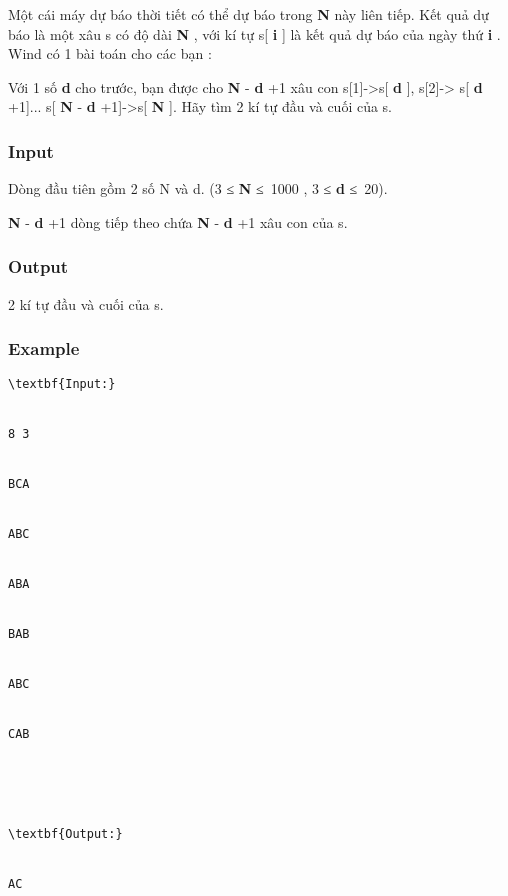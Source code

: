



   Một cái máy dự báo thời tiết có thể dự báo trong   \textbf{    N   }   này liên tiếp. Kết quả dự báo là một xâu s có độ dài   \textbf{    N   }   , với kí tự s[   \textbf{    i   }   ] là kết quả dự báo của ngày thứ   \textbf{    i   }   . Wind có 1 bài toán cho các bạn :  

   Với 1 số   \textbf{    d   }   cho trước, bạn được cho   \textbf{    N   }   -   \textbf{    d   }   +1 xâu con s[1]->s[   \textbf{    d   }   ], s[2]-> s[   \textbf{    d   }   +1]... s[   \textbf{    N   }   -   \textbf{    d   }   +1]->s[   \textbf{    N   }   ]. Hãy tìm 2 kí tự đầu và cuối của s.  

\subsubsection{   Input  }

   Dòng đầu tiên gồm 2 số N và d. (3 ≤   \textbf{    N   }   ≤ 1000 , 3 ≤   \textbf{    d   }   ≤ 20).  

\textbf{    N   }   -   \textbf{    d   }   +1 dòng tiếp theo chứa   \textbf{    N   }   -   \textbf{    d   }   +1 xâu con của s.  

\subsubsection{   Output  }

   2 kí tự đầu và cuối của s.  

\subsubsection{   Example  }
\begin{verbatim}
\textbf{Input:}


8 3


BCA


ABC


ABA


BAB


ABC


CAB





\textbf{Output:}


AC\end{verbatim}
